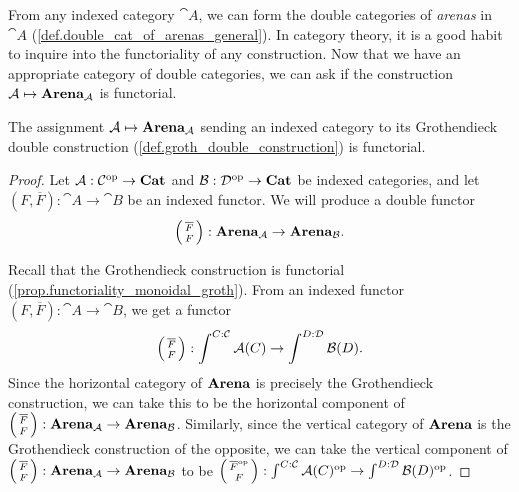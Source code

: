 \documentclass[DynamicalBook]{subfiles}
\begin{document}
From any indexed category $\cat{A}$, we can form the double categories of
\emph{arenas} in $\cat{A}$ (\cref{def.double_cat_of_arenas_general}). In
category theory, it is a good habit to inquire into the functoriality of any
construction. Now that we have an appropriate category of double categories, we
can ask if the construction $\mathcal{A} \mapsto \textbf{Arena}_{\mathcal{A}}$ is functorial.

\begin{proposition}\label{prop.functoriality_arena_construction}
The assignment $\mathcal{A} \mapsto \textbf{Arena}_{\mathcal{A}}$ sending an indexed
category to its Grothendieck double construction (\cref{def.groth_double_construction}) is functorial.
\end{proposition}
\begin{proof}
  Let $\mathcal{A} : \mathcal{C}^{\textnormal{op}} \to \textbf{Cat}$ and $\mathcal{B} : \mathcal{D}^{\textnormal{op}} \to
  \textbf{Cat}$ be indexed categories, and let $(F, \overline{F}) : \cat{A} \to
  \cat{B}$ be an indexed functor. We will produce a double functor
  \[
\lens{\overline{F}}{F} : \Cat{Arena}_{\cat{A}} \to \Cat{Arena}_{\cat{B}}.
  \]
  
  Recall that the Grothendieck construction is functorial
  (\cref{prop.functoriality_monoidal_groth}). From an indexed functor $(F,
  \overline{F}) : \cat{A} \to \cat{B}$, we get a functor
  \[
\lens{\overline{F}}{F} : \int^{C : \cat{C}} \cat{A}(C) \to \int^{D : \cat{D}} \cat{B}(D).
  \]
  Since the horizontal category of $\textbf{Arena}$ is precisely the Grothendieck
  construction, we can take this to be the horizontal component of
  $\lens{\overline{F}}{F} :\Cat{Arena}_{\cat{A}} \to \Cat{Arena}_{\cat{B}} $.
  Similarly, since the vertical category of $\textbf{Arena}$ is the Grothendieck
  construction of the opposite, we can take the vertical component of
  $\lens{\overline{F}}{F} :\Cat{Arena}_{\cat{A}} \to \Cat{Arena}_{\cat{B}} $ to
  be $\lens{\overline{F}\op}{F} : \int^{C : \cat{C}}\cat{A}(C)\op \to \int^{D :
    \cat{D}} \cat{B}(D)\op$. 


\end{proof}
\end{document}
